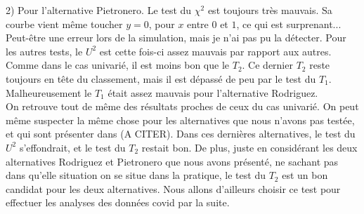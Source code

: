 \documentclass[12pt,a4paper]{article}
\begin{document}
2) Pour l'alternative Pietronero. Le test du $\chi^{2}$ est toujours très mauvais. Sa courbe vient même toucher $y=0$, pour $x$ entre $0$ et $1$, ce qui est surprenant... Peut-être une erreur lors de la simulation, mais je n'ai pas pu la détecter. Pour les autres tests, le $U^{2}$ est cette fois-ci assez mauvais par rapport aux autres. Comme dans le cas univarié, il est moins bon que le $T_{2}$. Ce dernier $T_{2}$ reste toujours en tête du classement, mais il est dépassé de peu par le test du $T_{1}$. Malheureusement le $T_{1}$ était assez mauvais pour l'alternative Rodriguez. \\

On retrouve tout de même des résultats proches de ceux du cas univarié. On peut même suspecter la même chose pour les alternatives que nous n'avons pas testée, et qui sont présenter dans (A CITER). Dans ces dernières alternatives, le test du $U^{2}$ s'effondrait, et le test du $T_{2}$ restait bon. De plus, juste en considérant les deux alternatives Rodriguez et Pietronero que nous avons présenté, ne sachant pas dans qu'elle situation on se situe dans la pratique, le test du $T_{2}$ est un bon candidat pour les deux alternatives. Nous allons d'ailleurs choisir ce test pour effectuer les analyses des données covid par la suite.
\end{document}
